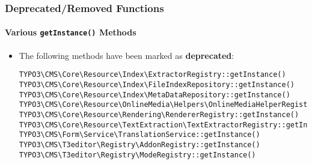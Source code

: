 %

\begin{frame}[fragile]
	\frametitle{Deprecated/Removed Functions}
	\framesubtitle{Various \texttt{getInstance()} Methods}


	\begin{itemize}
		\item The following methods have been marked as \textbf{deprecated}:
\begin{lstlisting}
TYPO3\CMS\Core\Resource\Index\ExtractorRegistry::getInstance()
TYPO3\CMS\Core\Resource\Index\FileIndexRepository::getInstance()
TYPO3\CMS\Core\Resource\Index\MetaDataRepository::getInstance()
TYPO3\CMS\Core\Resource\OnlineMedia\Helpers\OnlineMediaHelperRegistry::getInstance()
TYPO3\CMS\Core\Resource\Rendering\RendererRegistry::getInstance()
TYPO3\CMS\Core\Resource\TextExtraction\TextExtractorRegistry::getInstance()
TYPO3\CMS\Form\Service\TranslationService::getInstance()
TYPO3\CMS\T3editor\Registry\AddonRegistry::getInstance()
TYPO3\CMS\T3editor\Registry\ModeRegistry::getInstance()
\end{lstlisting}

	\end{itemize}

\end{frame}

